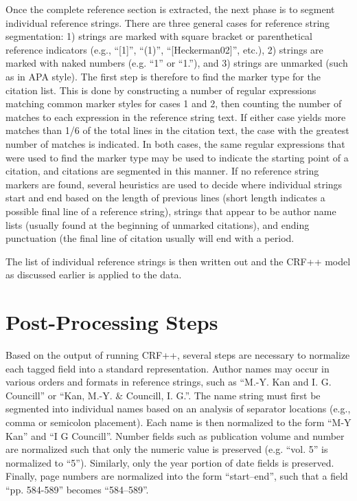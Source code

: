 \documentclass[10pt, a4paper]{article}
\begin{document}
Once the complete reference section is extracted, the next phase is to
segment individual reference strings. There are three general cases
for reference string segmentation: 1) strings are marked with square
bracket or parenthetical reference indicators (e.g., ``[1]'', ``(1)'',
``[Heckerman02]'', etc.), 2) strings are marked with naked numbers
(e.g. ``1'' or ``1.''), and 3) strings are unmarked (such as in APA
style). The first step is therefore to find the marker type for the
citation list. This is done by constructing a number of regular
expressions matching common marker styles for cases 1 and 2, then
counting the number of matches to each expression in the reference
string text. If either case yields more matches than 1/6 of the total
lines in the citation text, the case with the greatest number of
matches is indicated. In both cases, the same regular expressions that
were used to find the marker type may be used to indicate the starting
point of a citation, and citations are segmented in this manner. If no
reference string markers are found, several heuristics are used to
decide where individual strings start and end based on the length of
previous lines (short length indicates a possible final line of a
reference string), strings that appear to be author name lists
(usually found at the beginning of unmarked citations), and ending
punctuation (the final line of citation usually will end with a
period.

The list of individual reference strings is then written out and the
CRF++ model as discussed earlier is applied to the data.

\section{Post-Processing Steps}

Based on the output of running CRF++, several steps are necessary to
normalize each tagged field into a standard representation. Author
names may occur in various orders and formats in reference strings,
such as ``M.-Y. Kan and I. G. Councill'' or ``Kan, M.-Y. \& Councill,
I. G.''. The name string must first be segmented into individual names
based on an analysis of separator locations (e.g., comma or semicolon
placement). Each name is then normalized to the form ``M-Y Kan'' and
``I G Councill''. Number fields such as publication volume and number
are normalized such that only the numeric value is preserved
(e.g. ``vol. 5'' is normalized to ``5''). Similarly, only the year
portion of date fields is preserved. Finally, page numbers are
normalized into the form ``start--end'', such that a field
``pp. 584-589'' becomes ``584--589''.
\end{document}
